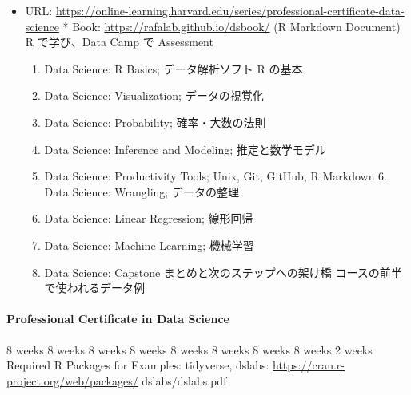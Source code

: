 \documentclass[
]{book}
\providecommand{\tightlist}{%
  \setlength{\itemsep}{0pt}\setlength{\parskip}{0pt}}
\theoremstyle{definition}
\theoremstyle{definition}
\theoremstyle{definition}
\theoremstyle{definition}
\theoremstyle{remark}
\begin{document}
\begin{itemize}
\item
  URL: \url{https://online-learning.harvard.edu/series/professional-certificate-data-science} * Book: \url{https://rafalab.github.io/dsbook/} (R Markdown Document)
  R で学び、Data Camp で Assessment

  \begin{enumerate}
  \def\labelenumi{\arabic{enumi}.}
  \tightlist
  \item
    Data Science: R Basics; データ解析ソフト R の基本
  \item
    Data Science: Visualization; データの視覚化
  \item
    Data Science: Probability; 確率・大数の法則
  \item
    Data Science: Inference and Modeling; 推定と数学モデル
  \item
    Data Science: Productivity Tools; Unix, Git, GitHub, R Markdown 6. Data Science: Wrangling; データの整理
  \item
    Data Science: Linear Regression; 線形回帰
  \item
    Data Science: Machine Learning; 機械学習
  \item
    Data Science: Capstone まとめと次のステップへの架け橋
    コースの前半で使われるデータ例
  \end{enumerate}
\end{itemize}

\hypertarget{professional-certificate-in-data-science-1}{%
\paragraph{Professional Certificate in Data Science}\label{professional-certificate-in-data-science-1}}

8 weeks 8 weeks 8 weeks 8 weeks 8 weeks 8 weeks 8 weeks 8 weeks 2 weeks
Required R Packages for Examples: tidyverse, dslabs: \url{https://cran.r-project.org/web/packages/} dslabs/dslabs.pdf
\end{document}
